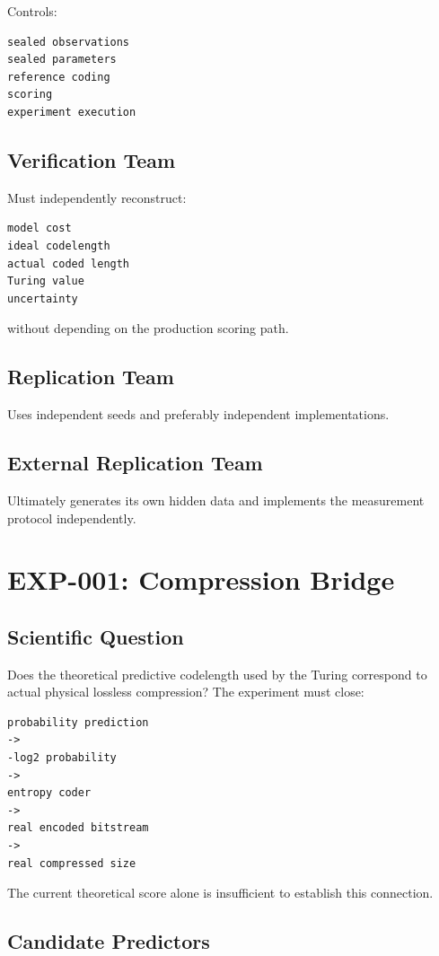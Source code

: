 \documentclass[11pt]{article}
\begin{document}
Controls:
\begin{verbatim}
sealed observations
sealed parameters
reference coding
scoring
experiment execution
\end{verbatim}

\subsection{Verification Team}

Must independently reconstruct:
\begin{verbatim}
model cost
ideal codelength
actual coded length
Turing value
uncertainty
\end{verbatim}
without depending on the production scoring path.

\subsection{Replication Team}

Uses independent seeds and preferably independent implementations.

\subsection{External Replication Team}

Ultimately generates its own hidden data and implements the measurement protocol independently.

\section{EXP-001: Compression Bridge}

\subsection{Scientific Question}

Does the theoretical predictive codelength used by the Turing correspond to actual physical lossless compression? The experiment must close:
\begin{verbatim}
probability prediction
->
-log2 probability
->
entropy coder
->
real encoded bitstream
->
real compressed size
\end{verbatim}
The current theoretical score alone is insufficient to establish this connection.

\subsection{Candidate Predictors}
\end{document}
